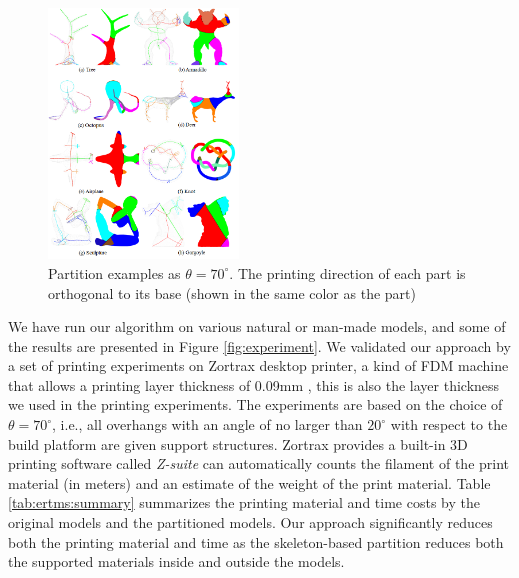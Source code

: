 \begin{figure}[tbp]
  \centering
  \includegraphics[width=0.45\textwidth]{figs/programming.png}
  \caption{\label{fig:programming}%
           Partition examples as $\theta = 70^{\circ}$. The printing direction of each part is orthogonal to its base (shown in the same color as the part)}
\end{figure}
We have run our algorithm on various natural or man-made models, and some of the results are presented in Figure \ref{fig:experiment}. We validated our approach by a set of printing experiments on Zortrax desktop printer, a kind of FDM machine that allows a printing layer thickness of 0.09mm , this is also the layer thickness we used in the printing experiments. The experiments are based on the choice of $\theta = 70^{\circ}$, i.e., all overhangs with an angle of no larger than $20^{\circ}$ with respect to the build platform are given support structures. Zortrax provides a built-in 3D printing software called \emph{Z-suite} can automatically counts the filament of the print material (in meters) and an estimate of the weight of the print material. Table \ref{tab:ertms:summary} summarizes the printing material and time costs by the original models and the partitioned models. Our approach significantly reduces both the printing material and time as the skeleton-based partition reduces both the supported materials inside and outside the models.


